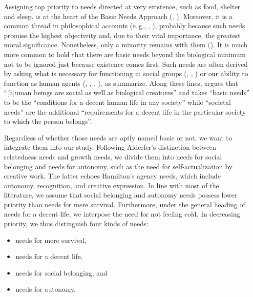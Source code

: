 \documentclass[egregdoesnotlikesansseriftitles]{scrartcl}
\begin{document}
Assigning top priority to needs directed at very existence, such as food, shelter and sleep, is at the heart of the Basic Needs Approach (\citealt{jolly_world_1976}, \citealt{ghai_basic_1978}).
Moreover, it is a common thread in philosophical accounts (e.\,g., \citealt{braybrooke_meeting_1987}, \citealt{wiggins_needs_1987,wiggins_what_1998}), probably because such needs promise the highest objectivity and, due to their vital importance, the greatest moral significance.
Nonetheless, only a minority remains with them (\citealt{daniels_just_1985}).
It is much more common to hold that there are basic needs beyond the biological minimum not to be ignored just because existence comes first.
Such needs are often derived by asking what is necessary for functioning in social groups (\citealt{braybrooke_meeting_1987}, \citealt{thomson_need_1987}, \citealt{wiggins_what_1998}) or our ability to function as human agents (\citealt{copp_equality_1998}, \citealt{gewirth_reason_1978}, \citealt{oneill_rights_1998}, \citealt{shue_basic_1996}), as \cite{brock_needs_2019} summarize.
Along these lines, \citet[3]{miller_national_2007} argues that ``[h]uman beings are social as well as biological creatures'' and takes ``basic needs'' to be the ``conditions for a decent human life in any society'' while ``societal needs'' are the additional ``requirements for a decent life in the particular society to which the person belongs''.

Regardless of whether those needs are aptly named basic or not, we want to integrate them into our study.
Following Alderfer's distinction between relatedness needs and growth needs, we divide them into needs for social belonging and needs for autonomy, such as the need for self-actualization by creative work.
The latter echoes Hamilton's agency needs, which include autonomy, recognition, and creative expression.
In line with most of the literature, we assume that social belonging and autonomy needs possess lower priority than needs for mere survival.
Furthermore, under the general heading of needs for a decent life, we interpose the need for not feeling cold.
In decreasing priority, we thus distinguish four kinds of needs:

\begin{itemize}
   \item needs for mere survival,
   \item needs for a decent life,
   \item needs for social belonging, and
   \item needs for autonomy.
\end{itemize}
\end{document}
